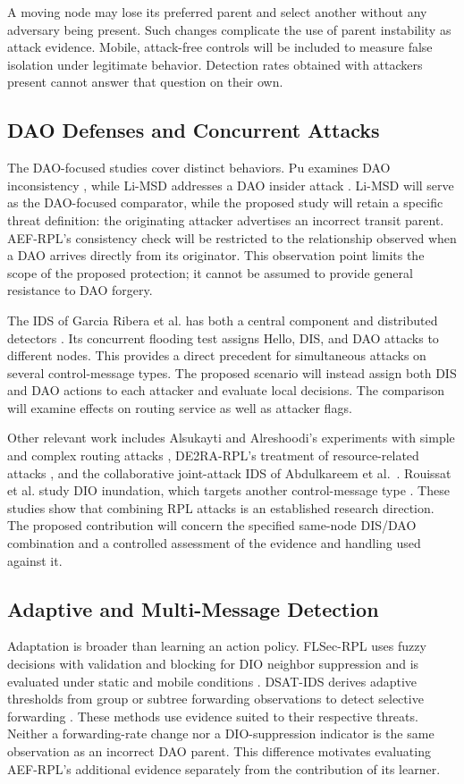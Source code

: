 \documentclass[journal]{IEEEtran}
\begin{document}
A moving node may lose its preferred parent and select another without any adversary being present. Such changes complicate the use of parent instability as attack evidence. Mobile, attack-free controls will be included to measure false isolation under legitimate behavior. Detection rates obtained with attackers present cannot answer that question on their own.

\subsection{DAO Defenses and Concurrent Attacks}
The DAO-focused studies cover distinct behaviors. Pu examines DAO inconsistency \cite{pu2018}, while Li-MSD addresses a DAO insider attack \cite{limsd2024}. Li-MSD will serve as the DAO-focused comparator, while the proposed study will retain a specific threat definition: the originating attacker advertises an incorrect transit parent. AEF-RPL's consistency check will be restricted to the relationship observed when a DAO arrives directly from its originator. This observation point limits the scope of the proposed protection; it cannot be assumed to provide general resistance to DAO forgery.

The IDS of Garcia Ribera et al. has both a central component and distributed detectors \cite{garciaribera2022}. Its concurrent flooding test assigns Hello, DIS, and DAO attacks to different nodes. This provides a direct precedent for simultaneous attacks on several control-message types. The proposed scenario will instead assign both DIS and DAO actions to each attacker and evaluate local decisions. The comparison will examine effects on routing service as well as attacker flags.

Other relevant work includes Alsukayti and Alreshoodi's experiments with simple and complex routing attacks \cite{alsukayti2023}, DE2RA-RPL's treatment of resource-related attacks \cite{de2rarpl2024}, and the collaborative joint-attack IDS of Abdulkareem et al.\ \cite{abdulkareem2024}. Rouissat et al. study DIO inundation, which targets another control-message type \cite{rouissat2023}. These studies show that combining RPL attacks is an established research direction. The proposed contribution will concern the specified same-node DIS/DAO combination and a controlled assessment of the evidence and handling used against it.

\subsection{Adaptive and Multi-Message Detection}
Adaptation is broader than learning an action policy. FLSec-RPL uses fuzzy decisions with validation and blocking for DIO neighbor suppression and is evaluated under static and mobile conditions \cite{flsecrpl2024}. DSAT-IDS derives adaptive thresholds from group or subtree forwarding observations to detect selective forwarding \cite{dsatids2024}. These methods use evidence suited to their respective threats. Neither a forwarding-rate change nor a DIO-suppression indicator is the same observation as an incorrect DAO parent. This difference motivates evaluating AEF-RPL's additional evidence separately from the contribution of its learner.
\end{document}
